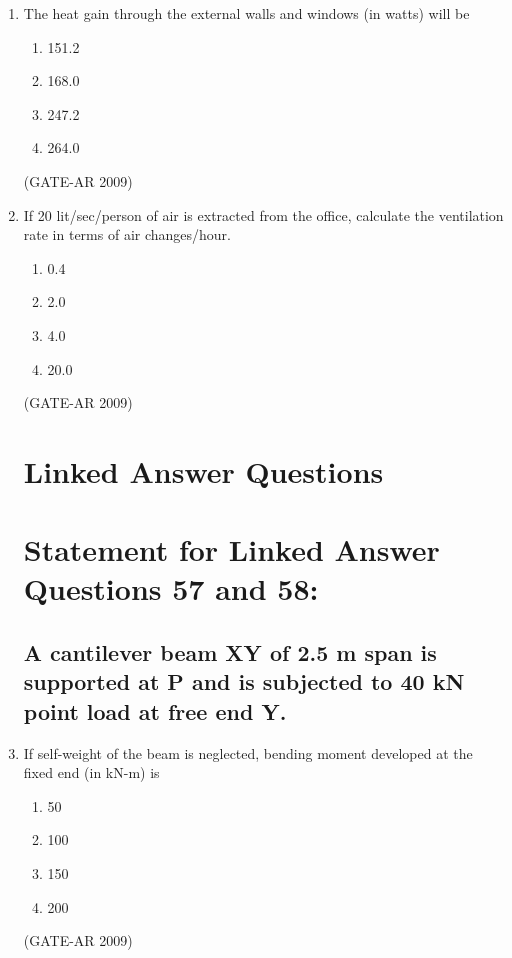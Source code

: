 \documentclass[a4paper,10pt]{article}
\begin{document}
\begin{enumerate}
    \item The heat gain through the external walls and windows (in watts) will be 
    \begin{multicols}{4}
	\begin{enumerate}
        \item 151.2
        \item 168.0
        \item 247.2
        \item 264.0
    \end{enumerate}
	\end{multicols}
    \hfill (GATE-AR 2009)

    \item If 20 lit/sec/person of air is extracted from the office, calculate the ventilation rate in terms of air changes/hour. 
    \begin{multicols}{4}
	\begin{enumerate}
        \item 0.4
        \item 2.0
        \item 4.0
        \item 20.0
    \end{enumerate}
	\end{multicols}
    \hfill (GATE-AR 2009)

\section*{Linked Answer Questions}

\section*{Statement for Linked Answer Questions 57 and 58:}
\subsection*{A cantilever beam XY of 2.5 m span is supported at P and is subjected to 40 kN point load at free end Y.}

    \item If self-weight of the beam is neglected, bending moment developed at the fixed end (in kN-m) is 
    \begin{multicols}{4}
	\begin{enumerate}
        \item 50
        \item 100
        \item 150
        \item 200
    \end{enumerate}
	\end{multicols}
    \hfill (GATE-AR 2009)


\end{enumerate}
\end{document}
